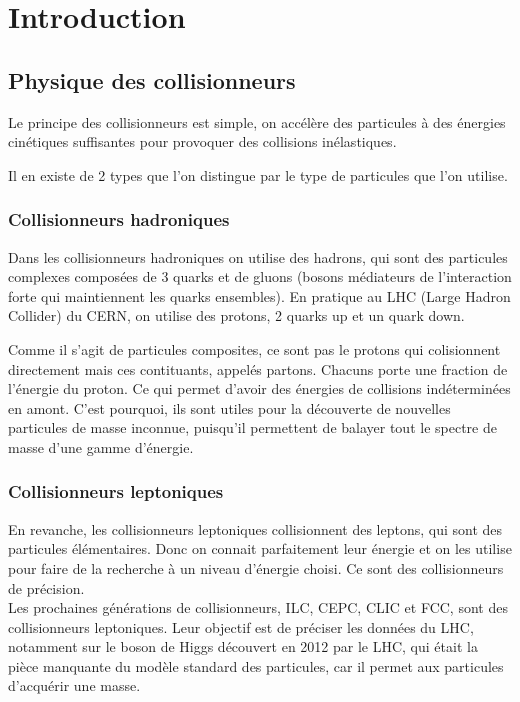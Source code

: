 \chapter{Introduction}

\section{Physique des collisionneurs}

Le principe des collisionneurs est simple, on accélère des particules à des 
énergies cinétiques suffisantes pour provoquer des collisions inélastiques.

Il en existe de 2 types que l'on distingue par le type de particules que l'on 
utilise.

\subsection{Collisionneurs hadroniques}

Dans les collisionneurs hadroniques on utilise des hadrons, qui sont des 
particules complexes composées de 3 quarks et de gluons (bosons médiateurs 
de l'interaction forte qui maintiennent les quarks ensembles). 
En pratique au LHC (Large Hadron Collider) du CERN, on utilise des protons, 
2 quarks up et un quark down. 

Comme il s'agit de particules composites, ce sont pas le protons qui colisionnent 
directement mais ces contituants, appelés partons. Chacuns porte une fraction de 
l'énergie du proton. 
Ce qui permet d'avoir des énergies de collisions indéterminées en amont.
C'est pourquoi, ils sont utiles pour la découverte de nouvelles particules de 
masse inconnue, puisqu'il permettent de balayer tout le spectre de masse d'une 
gamme d'énergie.

\subsection{Collisionneurs leptoniques}

En revanche, les collisionneurs leptoniques collisionnent des leptons, qui sont
des particules élémentaires. Donc on connait parfaitement leur énergie et on les 
utilise pour faire de la recherche à un niveau d'énergie choisi.  
Ce sont des collisionneurs de précision.\\

Les prochaines générations de collisionneurs, ILC, CEPC, CLIC et FCC, sont des 
collisionneurs leptoniques. Leur objectif est de préciser les données du LHC, 
notamment sur le boson de Higgs découvert en 2012 par le LHC, qui était la pièce 
manquante du modèle standard des particules, car il permet aux particules 
d'acquérir une masse.

